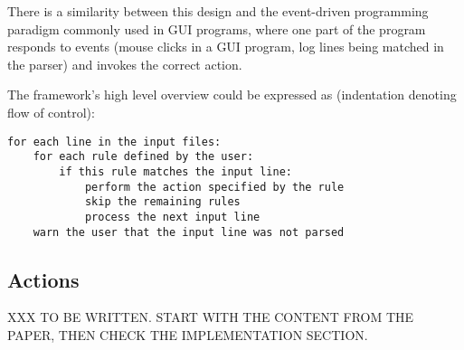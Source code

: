 There is a similarity between this design and the event-driven programming
paradigm commonly used in GUI programs, where one part of the program
responds to events (mouse clicks in a GUI program, log lines being matched
in the parser) and invokes the correct action.

The framework's high level overview could be expressed as (indentation
denoting flow of control):

\begin{verbatim}
for each line in the input files:
    for each rule defined by the user:
        if this rule matches the input line:
            perform the action specified by the rule
            skip the remaining rules
            process the next input line
    warn the user that the input line was not parsed
\end{verbatim}


\subsection{Actions}

\label{actions in architecture}

XXX TO BE WRITTEN\@.  START WITH THE CONTENT FROM THE PAPER, THEN CHECK THE
IMPLEMENTATION SECTION\@.

